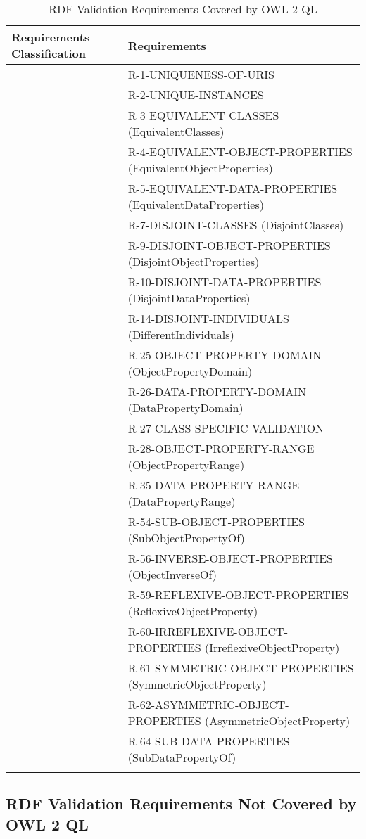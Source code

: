 \documentclass{llncs}
\newcommand{\hr}{\hline\noalign{\smallskip}} %
\begin{document}
\begin{table}
\caption{RDF Validation Requirements Covered by OWL 2 QL}
\label{tab:RequirementsCoveredOWL2QL}
\centering
\begin{tabular}{ll}
\hr
Requirements Classification & Requirements \\
\hr
& R-1-UNIQUENESS-OF-URIS \\
& R-2-UNIQUE-INSTANCES \\
& R-3-EQUIVALENT-CLASSES (EquivalentClasses) \\
& R-4-EQUIVALENT-OBJECT-PROPERTIES (EquivalentObjectProperties) \\
& R-5-EQUIVALENT-DATA-PROPERTIES (EquivalentDataProperties) \\
& R-7-DISJOINT-CLASSES (DisjointClasses) \\
& R-9-DISJOINT-OBJECT-PROPERTIES (DisjointObjectProperties) \\
& R-10-DISJOINT-DATA-PROPERTIES (DisjointDataProperties) \\
& R-14-DISJOINT-INDIVIDUALS (DifferentIndividuals) \\
& R-25-OBJECT-PROPERTY-DOMAIN (ObjectPropertyDomain) \\
& R-26-DATA-PROPERTY-DOMAIN (DataPropertyDomain) \\
& R-27-CLASS-SPECIFIC-VALIDATION \\
& R-28-OBJECT-PROPERTY-RANGE (ObjectPropertyRange) \\
& R-35-DATA-PROPERTY-RANGE (DataPropertyRange) \\
& R-54-SUB-OBJECT-PROPERTIES (SubObjectPropertyOf) \\
& R-56-INVERSE-OBJECT-PROPERTIES (ObjectInverseOf) \\
& R-59-REFLEXIVE-OBJECT-PROPERTIES (ReflexiveObjectProperty) \\
& R-60-IRREFLEXIVE-OBJECT-PROPERTIES (IrreflexiveObjectProperty) \\
& R-61-SYMMETRIC-OBJECT-PROPERTIES (SymmetricObjectProperty) \\
& R-62-ASYMMETRIC-OBJECT-PROPERTIES (AsymmetricObjectProperty) \\
& R-64-SUB-DATA-PROPERTIES (SubDataPropertyOf) \\
\hr
\end{tabular}
\end{table}

\subsection{RDF Validation Requirements Not Covered by OWL 2 QL}
\end{document}
